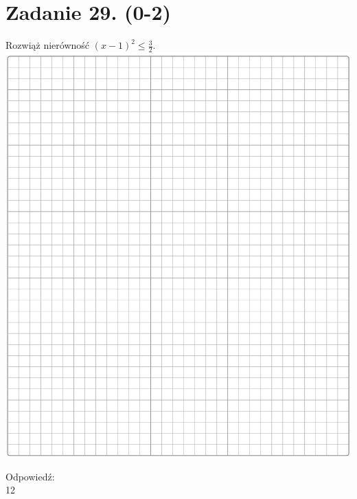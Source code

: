 \documentclass[10pt]{article}
\begin{document}
\section*{Zadanie 29. (0-2)}
Rozwiąż nierówność \((x-1)^{2} \leq \frac{3}{2}\).\\
\includegraphics[max width=\textwidth, center]{2024_11_21_cdea326d19d0c2132b88g-12}

Odpowiedź: \(\qquad\)\\
12
\end{document}
